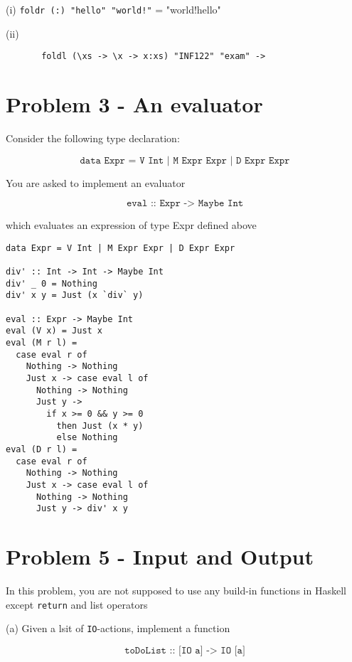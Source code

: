 \documentclass{article}
\begin{document}
    (i) \texttt{foldr (:) "hello" "world!"} = "world!hello"
    \medskip

    (ii) 
    \begin{lstlisting}
       foldl (\xs -> \x -> x:xs) "INF122" "exam" -> 
    \end{lstlisting}

    \section{Problem 3 - An evaluator}
    Consider the following type declaration:

    \[ \texttt{data Expr = V Int | M Expr Expr | D Expr Expr} \]

    You are asked to implement an evaluator

    \[ \texttt{eval :: Expr -> Maybe Int} \]

    which evaluates an expression of type Expr defined above

    \begin{ans}
        \hspace{1em}

        \begin{lstlisting}
data Expr = V Int | M Expr Expr | D Expr Expr

div' :: Int -> Int -> Maybe Int
div' _ 0 = Nothing
div' x y = Just (x `div` y)

eval :: Expr -> Maybe Int
eval (V x) = Just x
eval (M r l) =
  case eval r of
    Nothing -> Nothing
    Just x -> case eval l of
      Nothing -> Nothing
      Just y ->
        if x >= 0 && y >= 0
          then Just (x * y)
          else Nothing
eval (D r l) =
  case eval r of
    Nothing -> Nothing
    Just x -> case eval l of
      Nothing -> Nothing
      Just y -> div' x y
        \end{lstlisting}
    \end{ans}

    \section{Problem 5 - Input and Output}

    In this problem, you are not supposed to use any build-in functions in Haskell except \texttt{return} and list operators
    \medskip

    (a) Given a lsit of \texttt{IO}-actions, implement a function

    \[ \texttt{toDoList :: [IO a] -> IO [a]} \]
\end{document}

